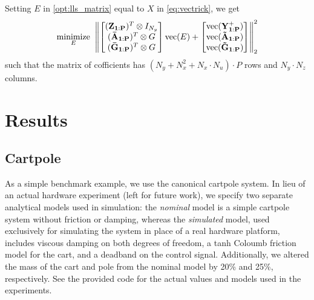 \documentclass{article}
\begin{document}
  Setting $E$ in \eqref{opt:lls_matrix} equal to $X$ in \eqref{eq:vectrick}, we get
  \begin{align} \label{opt:lls_matrix}
      \underset{E}{\text{minimize}} \;\;  
      \norm{
          \begin{bmatrix}
              (\mathbf{Z_{1:P}})^T \otimes I_{N_y} \\
              (\mathbf{\bar{A}_{1:P}})^T \otimes G \\
              (\mathbf{\bar{G}_{1:P}})^T \otimes G \\
          \end{bmatrix}
          \text{vec}(E)
          +
          \begin{bmatrix}
              \text{vec}(\mathbf{Y^+_{1:P}}) \\
              \text{vec}(\mathbf{\tilde{A}_{1:P}}) \\
              \text{vec}(\mathbf{\tilde{G}_{1:P}})
          \end{bmatrix}
      }_2^2
  \end{align}
  such that the matrix of cofficients has $(N_y + N_x^2 + N_x \cdot N_u) \cdot P$ rows and 
  $N_y \cdot N_z$ columns.

\section{Results} \label{sec:results}

\subsection{Cartpole}
As a simple benchmark example, we use the canonical cartpole system. In lieu of an actual 
hardware experiment (left for future work), we specify two separate analytical models used 
in simulation: the \textit{nominal} model is a simple cartpole system without friction or 
damping, whereas the \textit{simulated} model, used exclusively for simulating the system
in place of a real hardware platform, includes viscous damping on both degrees of freedom,
a tanh Coloumb friction model for the cart, and a deadband on the control signal. 
Additionally, we altered the mass of the cart and pole from the nominal model by 20\% and 
25\%, respectively. See the provided code for the actual values and models used in the 
experiments.
\end{document}
